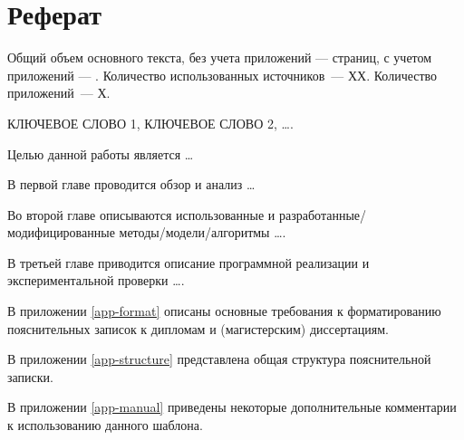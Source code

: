 \chapter*{Реферат}
\thispagestyle{plain}

Общий объем основного текста, без учета приложений ---
\pageref{end_of_main_text} страниц, с учетом приложений ---
\pageref{end_of_document}. Количество использованных источников~--- ХХ.
Количество приложений~--- Х.

\noindent \uppercase{ключевое слово 1, ключевое слово 2, \dots .}

Целью данной работы является \dots

В первой главе проводится обзор и анализ \dots 

Во второй главе описываются использованные и разработанные/модифицированные методы/модели/алгоритмы \dots. 

В третьей главе приводится описание программной реализации и экспериментальной проверки \dots.

В приложении \ref{app-format} описаны основные требования к форматированию пояснительных записок к дипломам и (магистерским) диссертациям.

В приложении \ref{app-structure} представлена общая структура пояснительной записки.

В приложении \ref{app-manual} приведены некоторые дополнительные комментарии к использованию данного шаблона.
